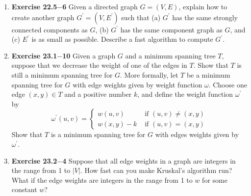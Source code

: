 \documentclass[a4paper,11pt,oneside]{book}
\begin{document}
\begin{enumerate}
  \item {\textbf{Exercise 22.5$-$6}} Given a directed graph $G=(V, E)$, explain how to create another graph $G^{\prime}=\left(V, E^{\prime}\right)$ such that (a) $G^{\prime}$ has the same strongly connected components as $G$, (b) $G^{\prime}$ has the same component graph as $G$, and (c) $E^{\prime}$ is as small as possible. Describe a fast algorithm to compute $G^{\prime}$.
  
  \item {\textbf{Exercise 23.1$-$10}} Given a graph $G$ and a minimum spanning tree $T$, suppose that we decrease the weight of one of the edges in $T$. Show that $T$ is still a minimum spanning tree for $G$. More formally, let $T$ be a minimum spanning tree for $G$ with edge weights given by weight function $\omega$. Choose one edge $(x, y) \in T$ and a positive number $k$, and define the weight function $\omega^{\prime}$ by
  $$
  \omega^{\prime}(u, v)= \begin{cases}w(u, v) & \text { if }(u, v) \neq(x, y) \\ w(x, y)-k & \text { if }(u, v)=(x, y)\end{cases}
  $$
  Show that $T$ is a minimum spanning tree for $G$ with edges weights given by $\omega^{\prime}$.
  
  \item {\textbf{Exercise 23.2$-$4}} Suppose that all edge weights in a graph are integers in the range from 1 to $|V|$. How fast can you make
  Kruskal's algorithm run? What if the edge weights are integers in the range from 1 to $w$ for some constant
  $w$?
  
  
\end{enumerate}
\end{document}
